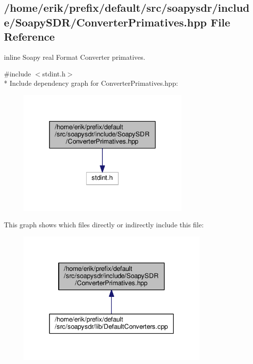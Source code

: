 \subsection{/home/erik/prefix/default/src/soapysdr/include/\+Soapy\+S\+D\+R/\+Converter\+Primatives.hpp File Reference}
\label{ConverterPrimatives_8hpp}


inline Soapy real Format Converter primatives.  


{\ttfamily \#include $<$stdint.\+h$>$}\\*
Include dependency graph for Converter\+Primatives.\+hpp\+:
\nopagebreak
\begin{figure}[H]
\begin{center}
\leavevmode
\includegraphics[width=242pt]{d7/db0/ConverterPrimatives_8hpp__incl}
\end{center}
\end{figure}
This graph shows which files directly or indirectly include this file\+:
\nopagebreak
\begin{figure}[H]
\begin{center}
\leavevmode
\includegraphics[width=270pt]{d0/dd1/ConverterPrimatives_8hpp__dep__incl}
\end{center}
\end{figure}
